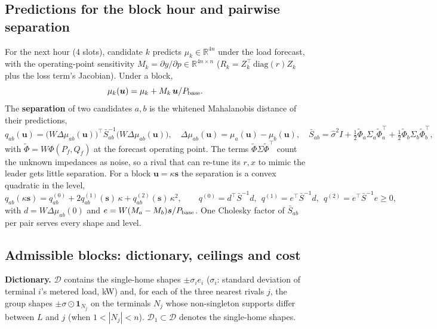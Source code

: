 \documentclass[11pt]{article}
\theoremstyle{definition}
\newcommand{\R}{\mathbb{R}}
\newcommand{\tp}{^{\top}}
\newcommand{\one}{\mathbf{1}}
\newcommand{\bu}{\bm{u}}
\newcommand{\bs}{\bm{s}}
\newcommand{\cD}{\mathcal{D}}
\begin{document}
{\subsection{Predictions for the block hour and pairwise separation}
For the next hour (4 slots), candidate $k$ predicts $\mu_k\in\R^{4n}$ under the load forecast, with the operating-point sensitivity $M_k=\partial y/\partial p\in\R^{4n\times n}$ ($R_k=Z_k\tp\,\mathrm{diag}(r)Z_k$ plus the loss term's Jacobian). Under a block,
\begin{equation}\label{eq:mu}
  \mu_k(\bu)=\mu_k+M_k\,\bu/P_{\rm base}.
\end{equation}
The \textbf{separation} of two candidates $a,b$ is the whitened Mahalanobis distance of their predictions,
\begin{equation}\label{eq:q}
  q_{ab}(\bu)=\big(W\Delta\mu_{ab}(\bu)\big)\tp\bar S_{ab}^{-1}\big(W\Delta\mu_{ab}(\bu)\big),\quad
  \Delta\mu_{ab}(\bu)=\mu_a(\bu)-\mu_b(\bu),\quad
  \bar S_{ab}=\hat\sigma^2I+\tfrac12\tilde\Phi_a\Sigma_a\tilde\Phi_a\tp+\tfrac12\tilde\Phi_b\Sigma_b\tilde\Phi_b\tp ,
\end{equation}
with $\tilde\Phi=W\Phi(P_f,Q_f)$ at the forecast operating point. The terms $\tilde\Phi\Sigma\tilde\Phi\tp$ count the unknown impedances as noise, so a rival that can re-tune its $r,x$ to mimic the leader gets little separation. For a block $\bu=\kappa\bs$ the separation is a convex quadratic in the level,
\begin{equation}\label{eq:quad}
  q_{ab}(\kappa\bs)=q^{(0)}_{ab}+2q^{(1)}_{ab}(\bs)\,\kappa+q^{(2)}_{ab}(\bs)\,\kappa^2,\qquad
  q^{(0)}=d\tp\bar S^{-1}d,\ \ q^{(1)}=e\tp\bar S^{-1}d,\ \ q^{(2)}=e\tp\bar S^{-1}e\ge0,
\end{equation}
with $d=W\Delta\mu_{ab}(0)$ and $e=W(M_a-M_b)\bs/P_{\rm base}$. One Cholesky factor of $\bar S_{ab}$ per pair serves every shape and level.

\subsection{Admissible blocks: dictionary, ceilings and cost}\label{sec:window}
\textbf{Dictionary.} $\cD$ contains the single-home shapes $\pm\sigma_i e_i$ ($\sigma_i$: standard deviation of terminal $i$'s metered load, kW) and, for each of the three nearest rivals $j$, the group shapes $\pm\sigma\odot\one_{N_j}$ on the terminals $N_j$ whose non-singleton supports differ between $L$ and $j$ (when $1<|N_j|<n$). $\cD_1\subset\cD$ denotes the single-home shapes.

}
\end{document}
